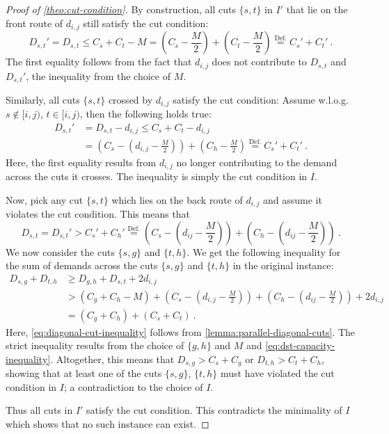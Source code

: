 \begin{proof}[Proof of \cref{theo:cut-condition}]
	By construction, all cuts $\{s, t\}$ in $I'$ that lie on the front route of $d_{i,j}$ still satisfy the cut condition:
	\begin{equation}
		D_{s,t}' = D_{s,t} \leq C_{s} + C_{t} - M = (C_{s} - \frac{M}{2}) + (C_{t} - \frac{M}{2}) \stackrel{\mathrm{Def.}}{=} C_{s}' + C_{t}' \ .
	\end{equation}
	The first equality follows from the fact that $d_{i,j}$ does not contribute to $D_{s,t}$ and $D_{s,t}'$, the inequality from the choice of $M$.
	
	Similarly, all cuts $\{s, t\}$ crossed by $d_{i,j}$ satisfy the cut condition:
	Assume w.l.o.g. $s \notin [i, j)$, $t \in [i, j)$, then the following holds true:
	\begin{align}
		D_{s,t}' &= D_{s,t} - d_{i,j} \leq C_s + C_t - d_{i,j} \\
		&= \left(C_s - \left(d_{i,j} - \frac{M}{2}\right)\right) + \left(C_h - \frac{M}{2}\right) \stackrel{\mathrm{Def.}}{=} C_s' + C_t' \ .
	\end{align}
	Here, the first equality results from $d_{i,j}$ no longer contributing to the demand across the cuts it crosses.
	The inequality is simply the cut condition in $I$.
	
	Now, pick any cut $\{s, t\}$ which lies on the back route of $d_{i,j}$ and assume it violates the cut condition.
	This means that
	\begin{equation}
		\label{eq:dst-capacity-inequality}
		D_{s,t} = D_{s,t}' > C_s' + C_h' \stackrel{\mathrm{Def.}}{=} \left(C_s - \left(d_{ij} - \frac{M}{2}\right)\right) + \left(C_h - \left(d_{ij} - \frac{M}{2}\right)\right) \ .
	\end{equation}
	We now consider the cuts $\{s, g\}$ and $\{t, h\}$.
	We get the following inequality for the sum of demands across the cuts $\{s, g\}$ and $\{t, h\}$ in the original instance:
	\begin{align}
		D_{s,g} + D_{t,h} &\geq D_{g,h} + D_{s,t} + 2 d_{i,j} \label{eq:diagonal-cut-inequality}\\
		&> (C_g + C_h - M) +  \left(C_s - \left(d_{i,j} - \frac{M}{2}\right)\right) + \left(C_h - \left(d_{ij} - \frac{M}{2}\right)\right) + 2 d_{i,j} \label{eq:strict-capacity-inequality}\\
		&= (C_g + C_h) + (C_s + C_t) \ .
	\end{align}
	Here, \ref{eq:diagonal-cut-inequality} follows from \cref{lemma:parallel-diagonal-cuts}.
	The strict inequality results from the choice of $\{g, h\}$ and $M$ and \cref{eq:dst-capacity-inequality}.
	Altogether, this means that $D_{s,g} > C_s + C_g$ or $D_{t,h} > C_t + C_h$, showing that at least one of the cuts $\{s, g\}$, $\{t, h\}$ must have violated the cut condition in $I$; a contradiction to the choice of $I$.
	
	Thus all cuts in $I'$ satisfy the cut condition.
	This contradicts the minimality of $I$ which shows that no such instance can exist.
\end{proof}

